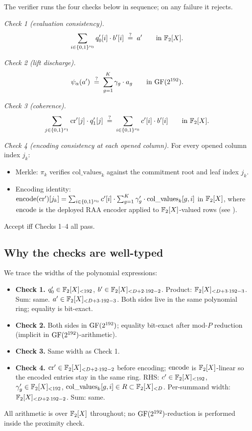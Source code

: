 \begin{construction}
\label{cons:open}
The verifier runs the four checks below in sequence; on any failure
it rejects.

\emph{Check 1 (evaluation consistency).}
\[
  \sum_{i \in \{0,1\}^{\nu_0}} q_0'[i] \cdot b'[i] \;\stackrel{?}{=}\; a'
  \qquad \text{in } \mathbb{F}_2[X].
\]

\emph{Check 2 (lift discharge).}
\[
  \psi_{\alpha}(a') \;\stackrel{?}{=}\; \sum_{g=1}^{K} \gamma_g \cdot a_g
  \qquad \text{in } \mathrm{GF}(2^{192}).
\]

\emph{Check 3 (coherence).}
\[
  \sum_{j \in \{0,1\}^{\nu_1}} \mathrm{cr}'[j] \cdot q_1'[j]
  \;\stackrel{?}{=}\;
  \sum_{i \in \{0,1\}^{\nu_0}} c'[i] \cdot b'[i]
  \qquad \text{in } \mathbb{F}_2[X].
\]

\emph{Check 4 (encoding consistency at each opened column).}
For every opened column index $j_k$:
\begin{itemize}[leftmargin=2em, label=---]
  \item Merkle: $\pi_k$ verifies $\mathrm{col\_values}_k$ against
    the commitment root and leaf index $j_k$.
  \item Encoding identity:
    $\operatorname{encode}(\mathrm{cr}')[j_k] = \sum_{i \in \{0,1\}^{\nu_0}}
    c'[i] \cdot \sum_{g=1}^{K} \gamma_g' \cdot \mathrm{col\_values}_k[g, i]$
    in $\mathbb{F}_2[X]$, where $\operatorname{encode}$ is the deployed RAA encoder applied
    to $\mathbb{F}_2[X]$-valued rows (see ).
\end{itemize}

Accept iff Checks 1--4 all pass.
\end{construction}

\subsection{Why the checks are well-typed}

We trace the widths of the polynomial expressions:
\begin{itemize}[leftmargin=2em]
  \item \textbf{Check 1.} $q_0' \in \mathbb{F}_2[X]_{<192}$, $b' \in
    \mathbb{F}_2[X]_{<D + 2 \cdot 192 - 2}$. Product:
    $\mathbb{F}_2[X]_{<D + 3 \cdot 192 - 3}$. Sum: same. $a' \in
    \mathbb{F}_2[X]_{<D + 3 \cdot 192 - 3}$. Both sides live in the same
    polynomial ring; equality is bit-exact.
  \item \textbf{Check 2.} Both sides in $\mathrm{GF}(2^{192})$; equality bit-exact
    after mod-$P$ reduction (implicit in $\mathrm{GF}(2^{192})$-arithmetic).
  \item \textbf{Check 3.} Same width as Check 1.
  \item \textbf{Check 4.} $\mathrm{cr}' \in \mathbb{F}_2[X]_{<D + 2
    \cdot 192 - 2}$ before encoding; $\operatorname{encode}$ is $\mathbb{F}_2[X]$-linear
    so the encoded entries stay in the same ring. RHS: $c' \in
    \mathbb{F}_2[X]_{<192}$, $\gamma_g' \in \mathbb{F}_2[X]_{<192}$,
    $\mathrm{col\_values}_k[g, i] \in R \subset
    \mathbb{F}_2[X]_{<D}$. Per-summand width:
    $\mathbb{F}_2[X]_{<D + 2 \cdot 192 - 2}$. Sum: same.
\end{itemize}
All arithmetic is over $\mathbb{F}_2[X]$ throughout; no $\mathrm{GF}(2^{192})$-reduction is
performed inside the proximity check.

